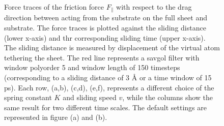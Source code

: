 \begin{figure}[H]
  \hfill
     \caption{Force traces of the friction force $F_\parallel$ with respect to the drag direction between acting from the substrate on the full sheet and substrate. The force traces is plotted against the sliding distance (lower x-axis) and thr corresponding sliding time (upper x-axis). The sliding distance is measured by displacement of the virtual atom tethering the sheet. The red line represents a savgol filter with window polyorder 5 and window length of 150 timesteps (corresponding to a sliding distance of 3 Å or a time window of 15 ps). Each row, (a,b), (c,d), (e,f), represents a different choice of the spring constant $K$ and sliding speed $v$, while the columns show the same result for two different time scales. The default settings are represented in figure (a) and (b).}
     \label{fig:drag_Ff}
\end{figure}

